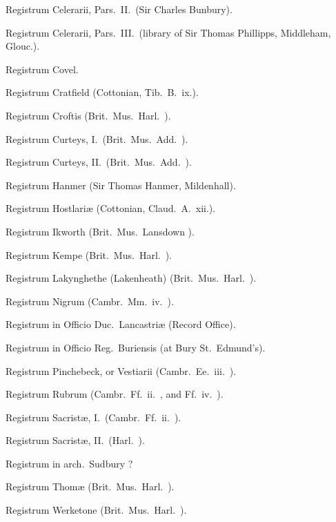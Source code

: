 \documentclass[10pt]{book}
\begin{document}
{Registrum Celerarii, Pars.\ II.\ (Sir Charles Bunbury).

Registrum Celerarii, Pars.\ III.\ (library of Sir Thomas Phillipps, Middleham, Glouc.).

Registrum Covel.

Registrum Cratfield (Cottonian, Tib.\ B.\ ix.).

Registrum Croftis (Brit.\ Mus.\ Harl.\ ).

Registrum Curteys, I.\ (Brit.\ Mus.\ Add.\ ).

Registrum Curteys, II.\ (Brit.\ Mus.\ Add.\ ).

Registrum Hanmer (Sir Thomas Hanmer, Mildenhall).

Registrum Hostlari\ae{} (Cottonian, Claud.\ A.\ xii.).

Registrum Ikworth (Brit.\ Mus.\ Lansdown ).

Registrum Kempe (Brit.\ Mus.\ Harl.\ ).

Registrum Lakynghethe (Lakenheath) (Brit.\ Mus.\ Harl.\ ).

Registrum Nigrum (Cambr.\ Mm.\ iv.\ ).

Registrum in Officio Duc.\ Lancastri\ae{} (Record Office).

Registrum in Officio Reg.\ Buriensis (at Bury St.\ Edmund's).

Registrum Pinchebeck, or Vestiarii (Cambr.\ Ee.\ iii.\ ).

Registrum Rubrum (Cambr.\ Ff.\ ii.\ , and Ff.\ iv.\ ).

Registrum Sacrist\ae{}, I.\ (Cambr.\ Ff.\ ii.\ ).

Registrum Sacrist\ae{}, II.\ (Harl.\ ).

Registrum in arch.\ Sudbury ?

Registrum Thom\ae{} (Brit.\ Mus.\ Harl.\ ).

Registrum Werketone (Brit.\ Mus.\ Harl.\ ).

}
\end{document}

